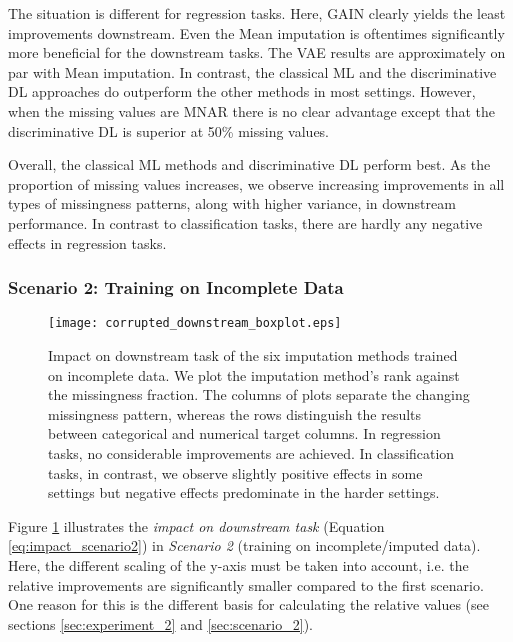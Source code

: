 The situation is different for regression tasks. Here, GAIN clearly yields the least improvements downstream. Even the Mean imputation is oftentimes significantly more beneficial for the downstream tasks. The VAE results are approximately on par with Mean imputation. In contrast, the classical ML and the discriminative DL approaches do outperform the other methods in most settings. However, when the missing values are MNAR there is no clear advantage except that the discriminative DL is superior at 50\% missing values.

Overall, the classical ML methods and discriminative DL perform best. As the proportion of missing values increases, we observe increasing improvements in all types of missingness patterns, along with higher variance, in downstream performance. In contrast to classification tasks, there are hardly any negative effects in regression tasks.

\subsubsection{Scenario 2: Training on Incomplete Data}



\begin{figure}\centering
	\texttt{[image: corrupted\_downstream\_boxplot.eps]}

	\caption[Downstream Ranks - Corrupted]{Impact on downstream task of the six imputation methods trained on incomplete data. We plot the imputation method's rank against the missingness fraction. The columns of plots separate the changing missingness pattern, whereas the rows distinguish the results between categorical and numerical target columns. In regression tasks, no considerable improvements are achieved. In classification tasks, in contrast, we observe slightly positive effects in some settings but negative effects predominate in the harder settings.
    }
	\label{fig:corrupted_downstream_boxplot}
\end{figure}

Figure \ref{fig:corrupted_downstream_boxplot} illustrates the \textit{impact on downstream task} (Equation \ref{eq:impact_scenario2}) in \textit{Scenario 2} (training on incomplete/imputed data). Here, the different scaling of the y-axis must be taken into account, i.e. the relative improvements are significantly smaller compared to the first scenario. One reason for this is the different basis for calculating the relative values (see sections \ref{sec:experiment_2} and \ref{sec:scenario_2}).

